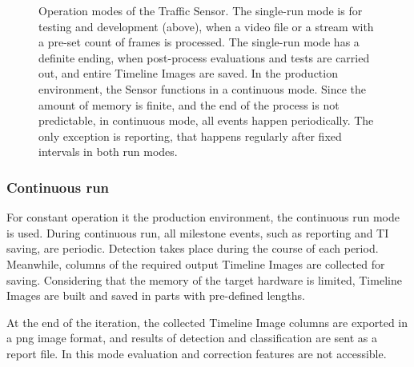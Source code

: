 \begin{figure}[!h]
	\centering
	
	\caption{Operation modes of the Traffic Sensor. The single-run mode is for testing and development (above), when a video file or a stream with a pre-set count of frames is processed. The single-run mode has a definite ending, when post-process evaluations and tests are carried out, and entire Timeline Images are saved. In the production environment, the Sensor functions in a continuous mode. Since the amount of memory is finite, and the end of the process is not predictable, in continuous mode, all events happen periodically. The only exception is reporting, that happens regularly after fixed intervals in both run modes. \label{fig:run_types}}
\end{figure}
\subsubsection{Continuous run}
For constant operation it the production environment, the continuous run mode is used.
During continuous run, all milestone events, such as reporting and TI saving, are periodic. 
Detection takes place during the course of each period. 
Meanwhile, columns of the required output Timeline Images are collected for saving.
Considering that the memory of the target hardware is limited, Timeline Images are built and saved in parts with pre-defined lengths.

At the end of the iteration, the collected Timeline Image columns are exported in a png image format, and results of detection and classification are sent as a report file.
In this mode evaluation and correction features are not accessible.

